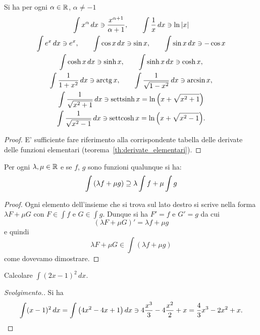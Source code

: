 \begin{theorem}
Si ha
per ogni $\alpha \in {\mathbb R}$, $\alpha\neq -1$
\begin{gather*}
\int x^\alpha\, dx \ni \frac{x^{\alpha+1}}{\alpha+1},
\qquad
\int \frac{1}{x}\, dx \ni \ln{\left|x\right|}
\\
\int e^x \, dx \ni e^x,
\qquad
\int \cos x\, dx \ni \sin x,
\qquad
\int \sin x\, dx \ni -\cos x
\\
\int \cosh x \, dx \ni \sinh x,\qquad
\int \sinh x \, dx \ni \cosh x, \\
\int \frac{1}{1+x^2}\, dx \ni \operatorname{arctg} x, \qquad
\int \frac{1}{\sqrt{1-x^2}}\, dx \ni \arcsin x, \\
\int \frac{1}{\sqrt{x^2+1}}\, dx \ni \operatorname{settsinh} x = \ln{\left( x+\sqrt{x^2+1} \right)}\\
\int \frac{1}{\sqrt{x^2-1}}\, dx \ni \operatorname{settcosh} x = \ln{\left( x+\sqrt{x^2-1} \right)}.
\end{gather*}
\end{theorem}
%
\begin{proof}
E' sufficiente fare riferimento alla corrispondente tabella
delle derivate delle funzioni elementari (teorema~\ref{th:derivate_elementari}).
\end{proof}

\begin{theorem}
Per ogni $\lambda,\mu \in {\mathbb R}$ e se $f$, $g$ sono funzioni qualunque si ha:
\[
  \int {\left( \lambda f + \mu g \right)} \supseteq \lambda \int f + \mu \int g
\]
\end{theorem}
%
\begin{proof}
Ogni elemento dell'insieme che si trova sul lato destro
si scrive nella forma $\lambda F + \mu G$ con $F\in \int f$ e $G\in \int g$.
Dunque si ha $F'=f$ e $G'=g$ da cui
\[
  (\lambda F + \mu G)' = \lambda f + \mu g
\]
e quindi
\[
  \lambda F + \mu G \in \int (\lambda f + \mu g)
\]
come dovevamo dimostrare.
\end{proof}

\begin{example}\label{ex:234045}
  Calcolare $\int (2x-1)^2\, dx$.
\end{example}
\begin{proof}[Svolgimento.]
  Si ha 
  \[
  \int (x-1)^2\, dx = \int {\left( 4x^2 - 4x +1 \right)}\, dx 
  \ni 4\frac{x^3}{3} - 4 \frac {x^2}{2} + x
  = \frac 4 3 x^3 - 2 x^2 + x.
  \]
\end{proof}

